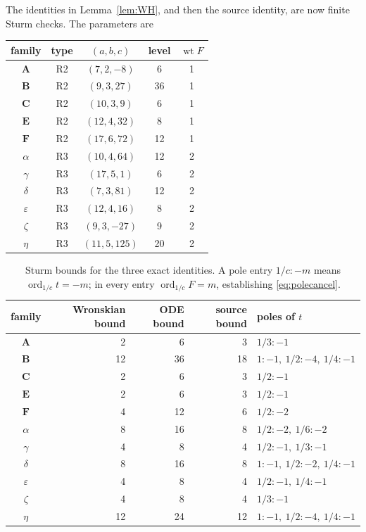 \documentclass[11pt]{article}
\theoremstyle{remark}
\begin{document}
The identities in Lemma~\ref{lem:WH}, and then the source identity, are now
finite Sturm checks.  The parameters are
\begin{center}
\small
\begin{tabular}{@{}c c c c c@{}}
\toprule
family & type & $(a,b,c)$ & level & $\operatorname{wt}F$\\
\midrule
$\mathbf A$&R2&$(7,2,-8)$&6&1\\
$\mathbf B$&R2&$(9,3,27)$&36&1\\
$\mathbf C$&R2&$(10,3,9)$&6&1\\
$\mathbf E$&R2&$(12,4,32)$&8&1\\
$\mathbf F$&R2&$(17,6,72)$&12&1\\
$\alpha$&R3&$(10,4,64)$&12&2\\
$\gamma$&R3&$(17,5,1)$&6&2\\
$\delta$&R3&$(7,3,81)$&12&2\\
$\varepsilon$&R3&$(12,4,16)$&8&2\\
$\zeta$&R3&$(9,3,-27)$&9&2\\
$\eta$&R3&$(11,5,125)$&20&2\\
\bottomrule
\end{tabular}
\end{center}

\begin{table}[ht]
\centering
\small
\begin{tabular}{@{}c r r r l@{}}
\toprule
family & Wronskian bound & ODE bound & source bound & poles of $t$\\
\midrule
$\mathbf A$&2&6&3&$1/3:-1$\\
$\mathbf B$&12&36&18&$1:-1,\ 1/2:-4,\ 1/4:-1$\\
$\mathbf C$&2&6&3&$1/2:-1$\\
$\mathbf E$&2&6&3&$1/2:-1$\\
$\mathbf F$&4&12&6&$1/2:-2$\\
$\alpha$&8&16&8&$1/2:-2,\ 1/6:-2$\\
$\gamma$&4&8&4&$1/2:-1,\ 1/3:-1$\\
$\delta$&8&16&8&$1:-1,\ 1/2:-2,\ 1/4:-1$\\
$\varepsilon$&4&8&4&$1/2:-1,\ 1/4:-1$\\
$\zeta$&4&8&4&$1/3:-1$\\
$\eta$&12&24&12&$1:-1,\ 1/2:-4,\ 1/4:-1$\\
\bottomrule
\end{tabular}
\caption{Sturm bounds for the three exact identities.  A pole entry
$1/c:-m$ means $\operatorname{ord}_{1/c}t=-m$; in every entry
$\operatorname{ord}_{1/c}F=m$, establishing \eqref{eq:polecancel}.}
\label{tab:bounds}
\end{table}
\end{document}
